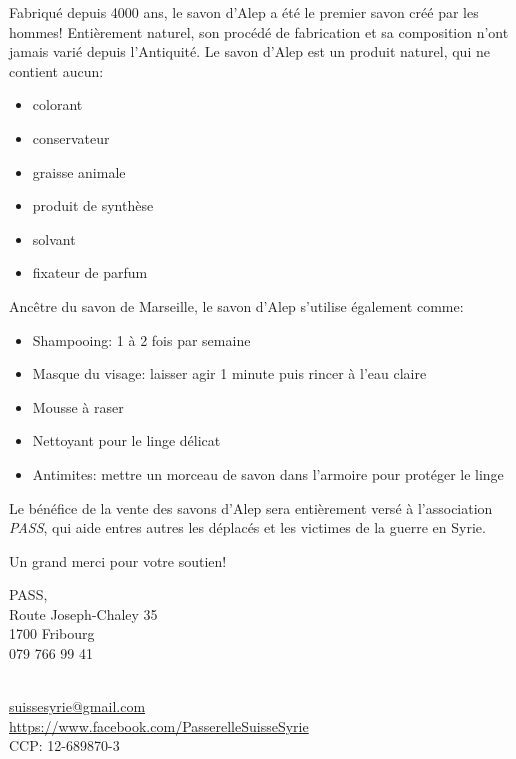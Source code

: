 \documentclass[frenchb,16pt,parskip=half-]{scrartcl}
\begin{document}
Fabriqué depuis 4000 ans,
    le savon d'Alep a été le premier savon créé par les hommes! Entièrement naturel,
    son procédé de fabrication et sa composition n'ont jamais varié depuis l'Antiquité.
\vfill
Le savon d'Alep est un produit naturel, qui ne contient aucun:\\[-1.8em]
\begin{multicols}{3}
    \begin{itemize}
        \item colorant
        \item conservateur
        \item graisse animale
        \item produit de synthèse
        \item solvant
        \item fixateur de parfum
    \end{itemize}
\end{multicols}%
Ancêtre du savon de Marseille, le savon d'Alep s'utilise également comme:
\begin{itemize}
    \item Shampooing: 1 à 2 fois par semaine
    \item Masque du visage: laisser agir 1 minute puis rincer à l'eau  claire
    \item Mousse à raser
    \item Nettoyant pour le linge délicat
    \item Antimites: mettre un morceau de savon dans l'armoire pour protéger le linge
\end{itemize}\vfill
\begin{center}
    Le bénéfice de la vente des savons d'Alep sera entièrement versé à l'association \emph{PASS},
    qui aide entres autres les déplacés et les victimes de la guerre en Syrie.

    \vfill
    {\huge Un grand merci pour votre soutien!}
\end{center}
\vfill
\begin{minipage}[t]{.38\linewidth}
    PASS,\\ Route Joseph-Chaley 35\\ 1700 Fribourg\\ 079 766 99 41
\end{minipage}
\begin{minipage}[t]{.6\linewidth}
    ~\\ \url{suissesyrie@gmail.com}\\ \url{https://www.facebook.com/PasserelleSuisseSyrie}\\ CCP: 12-689870-3
\end{minipage}
\end{document}

